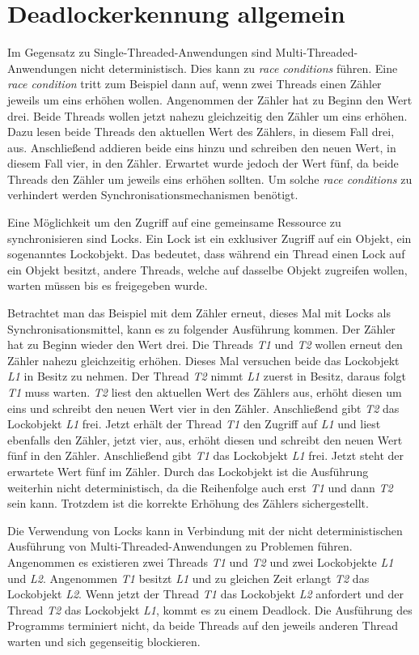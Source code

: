 \section{Deadlockerkennung allgemein}
\label{section:Deadlockerkennung allgemein}
Im Gegensatz zu Single-Threaded-Anwendungen sind Multi-Threaded-Anwendungen
nicht deterministisch. Dies kann zu \emph{race conditions} führen. Eine
\emph{race condition} tritt zum Beispiel dann auf, wenn zwei Threads einen
Zähler jeweils um eins erhöhen wollen. Angenommen der Zähler hat zu Beginn den
Wert drei. Beide Threads wollen jetzt nahezu gleichzeitig den Zähler um eins
erhöhen. Dazu lesen beide Threads den aktuellen Wert des Zählers, in diesem Fall
drei, aus. Anschließend addieren beide eins hinzu und schreiben den neuen Wert,
in diesem Fall vier, in den Zähler. Erwartet wurde jedoch der Wert fünf, da
beide Threads den Zähler um jeweils eins erhöhen sollten. Um solche \emph{race
conditions} zu verhindert werden Synchronisationsmechanismen benötigt.

Eine Möglichkeit um den Zugriff auf eine gemeinsame Ressource zu synchronisieren
sind Locks. Ein Lock ist ein exklusiver Zugriff auf ein Objekt, ein sogenanntes
Lockobjekt. Das bedeutet, dass während ein Thread einen Lock auf ein Objekt
besitzt, andere Threads, welche auf dasselbe Objekt zugreifen wollen, warten
müssen bis es freigegeben wurde.

Betrachtet man das Beispiel mit dem Zähler erneut, dieses Mal mit Locks als
Synchronisationsmittel, kann es zu folgender Ausführung kommen. Der Zähler hat
zu Beginn wieder den Wert drei. Die Threads \emph{T1} und \emph{T2} wollen
erneut den Zähler nahezu gleichzeitig erhöhen. Dieses Mal versuchen beide das
Lockobjekt \emph{L1} in Besitz zu nehmen. Der Thread \emph{T2} nimmt
\emph{L1} zuerst in Besitz, daraus folgt \emph{T1} muss warten. \emph{T2}
liest den aktuellen Wert des Zählers aus, erhöht diesen um eins und schreibt den
neuen Wert vier in den Zähler. Anschließend gibt \emph{T2} das Lockobjekt
\emph{L1} frei. Jetzt erhält der Thread \emph{T1} den Zugriff auf \emph{L1} und
liest ebenfalls den Zähler, jetzt vier, aus, erhöht diesen und schreibt den
neuen Wert fünf in den Zähler. Anschließend gibt \emph{T1} das Lockobjekt
\emph{L1} frei. Jetzt steht der erwartete Wert fünf im Zähler. Durch das
Lockobjekt ist die Ausführung weiterhin nicht deterministisch, da die
Reihenfolge auch erst \emph{T1} und dann \emph{T2} sein kann. Trotzdem ist die
korrekte Erhöhung des Zählers sichergestellt.

Die Verwendung von Locks kann in Verbindung mit der nicht deterministischen
Ausführung von Multi-Threaded-Anwendungen zu Problemen führen. Angenommen es
existieren zwei Threads \emph{T1} und \emph{T2} und zwei Lockobjekte \emph{L1}
und \emph{L2}. Angenommen \emph{T1} besitzt \emph{L1} und zu gleichen Zeit
erlangt \emph{T2} das Lockobjekt \emph{L2}. Wenn jetzt der Thread \emph{T1} das
Lockobjekt \emph{L2} anfordert und der Thread \emph{T2} das Lockobjekt
\emph{L1}, kommt es zu einem Deadlock. Die Ausführung des Programms terminiert
nicht, da beide Threads auf den jeweils anderen Thread warten und sich
gegenseitig blockieren.

